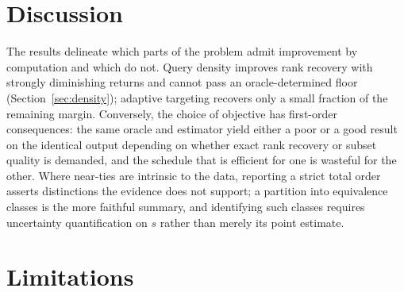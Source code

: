\documentclass[11pt,a4paper]{article}
\begin{document}
\section{Discussion}

The results delineate which parts of the problem admit improvement by
computation and which do not. Query density improves rank recovery with strongly
diminishing returns and cannot pass an oracle-determined floor
(Section~\ref{sec:density}); adaptive targeting recovers only a small fraction
of the remaining margin. Conversely, the choice of objective has first-order
consequences: the same oracle and estimator yield either a poor or a good result
on the identical output depending on whether exact rank recovery or subset
quality is demanded, and the schedule that is efficient for one is wasteful for
the other. Where near-ties are intrinsic to the data, reporting a strict total
order asserts distinctions the evidence does not support; a partition into
equivalence classes is the more faithful summary, and identifying such classes
requires uncertainty quantification on $s$ rather than merely its point estimate.

\section{Limitations}
\label{sec:limitations}
\end{document}
